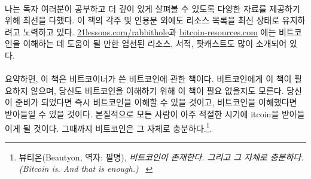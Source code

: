 \paragraph{}
나는 독자 여러분이 공부하고 더 깊이 있게 살펴볼 수 있도록 다양한 자료를 제공하기 위해 최선을 다했다.
이 책의 각주 및 인용문 외에도 리소스 목록을 최신 상태로 유지하려고 노력하고 있다. 
\href{https://21lessons.com/rabbithole}{21lessons.com/rabbithole}과 \href{https://bitcoin-resources.com}{bitcoin-resources.com}
에는 비트코인을 이해하는 데 도움이 될 만한 엄선된 리소스, 서적, 팟캐스트도 많이 소개되어 있다.

\paragraph{}
요약하면, 이 책은 비트코이너가 쓴 비트코인에 관한 책이다. 
비트코인에게 이 책이 필요하지 않으며, 당신도 비트코인을 이해하기 위해 이 책이 필요 없을지도 모른다. 
당신이 준비가 되었다면 즉시 비트코인을 이해할 수 있을 것이고, 
비트코인을 이해했다면 받아들일 수 있을 것이다. 
본질적으로 모든 사람이 아주 적절한 시기에 \bitcoinB{}itcoin을 받아들이게 될 것이다. 
그때까지 비트코인은 그 자체로 충분하다.\footnote{뷰티온(Beautyon, 역자: 필명), \textit{비트코인이 존재한다. 그리고 그 자체로 충분하다. (Bitcoin is. And that is enough.)} ~\cite{bitcoin-is}}.